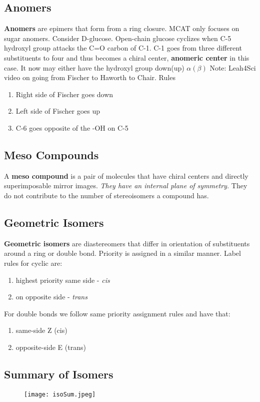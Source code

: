 \documentclass[../OChemReview.tex]{subfiles}
\begin{document}
  \subsection{Anomers}

  \textbf{Anomers} are epimers that form from a ring closure. MCAT only focuses
  on sugar anomers. Consider D-glucose. Open-chain glucose cyclizes when C-5
  hydroxyl group attacks the C=O carbon of C-1. C-1 goes from three different
  substituents to four and thus becomes a chiral center, \textbf{anomeric
  center} in this case. It now may either have the hydroxyl group down(up) $
  \alpha(\beta) $ Note: Leah4Sci video on going from Fischer to Haworth to
  Chair. Rules
  \begin{enumerate}
    \item Right side of Fischer goes down
    \item Left side of Fischer goes up
    \item C-6 goes opposite of the -OH on C-5
  \end{enumerate}

  \subsection{Meso Compounds}

  A \textbf{meso compound} is a pair of molecules that have chiral centers and
  directly superimposable mirror images. \emph{They have an internal plane of
  symmetry.} They do not contribute to the number of stereoisomers a compound 
  has.

  \subsection{Geometric Isomers}

  \textbf{Geometric isomers} are diastereomers that differ in orientation of
  substituents around a ring or double bond. Priority is assigned in a similar
  manner. Label rules for cyclic are:
  \begin{enumerate}
    \item highest priority same side - \emph{cis}
    \item on opposite side - \emph{trans}
  \end{enumerate}

  For double bonds we follow same priority assignment rules and have that:
  \begin{enumerate}
    \item same-side Z (cis)
    \item opposite-side E (trans)
  \end{enumerate}
  \newpage
  \subsection{Summary of Isomers}

  \begin{figure}[h]
    \centering
    \texttt{[image: isoSum.jpeg]}
  \end{figure}	
\end{document}
